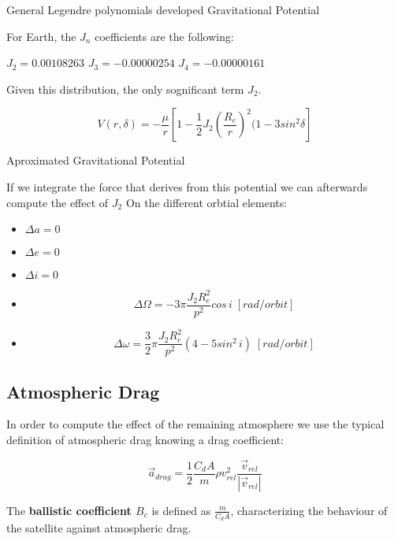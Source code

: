 General Legendre polynomials developed Gravitational Potential

For Earth, the $J_{n}$ coefficients are the following:

$J_{2} = 0.00108263$
$J_{3} = -0.00000254$
$J_{4} = -0.00000161$

Given this distribution, the only sognificant term $J_{2}$.

\begin{equation}
V(r,\delta) = -\frac{\mu}{r} \left [1-\frac{1}{2}   J_{2}\left( \frac{R_{e}}{r}\right) ^{2} (1-3sin^2\delta  \right ]
\end{equation}

Aproximated Gravitational Potential

If we integrate the force that derives from this potential we can afterwards compute the effect of $J_{2}$ On the different orbtial elements:

\begin{itemize}
\item $\Delta a = 0$
\item $\Delta e = 0$
\item $\Delta i = 0$
\item 
\begin{equation}\Delta\Omega = -3\pi \frac{J_{2}R_{e}^2}{p^2}cos\,i\; [rad/orbit]
\end{equation}
\item 
\begin{equation}\Delta\omega = \frac{3}{2} \pi \frac{J_{2}R_{e}^2}{p^2}(4-5sin^2\,i)\; [rad/orbit]
\end{equation}

\end{itemize}

\subsection{Atmospheric Drag}
In order to compute the effect of the remaining atmosphere we use the typical definition of atmospheric drag knowing a drag coefficient:

\begin{equation}
\vec{a}_{drag}= \frac{1}{2}\frac{C_{d}A}{m}\rho v_{rel}^2 \frac{\vec{v}_{rel}}{|\vec{v}_{rel}|}
\label{eq:drag}
\end{equation}

The \textbf{ballistic coefficient $B_{c}$} is defined as $\frac{m}{C_{d}A}$, characterizing the behaviour of the satellite against atmospheric drag.

